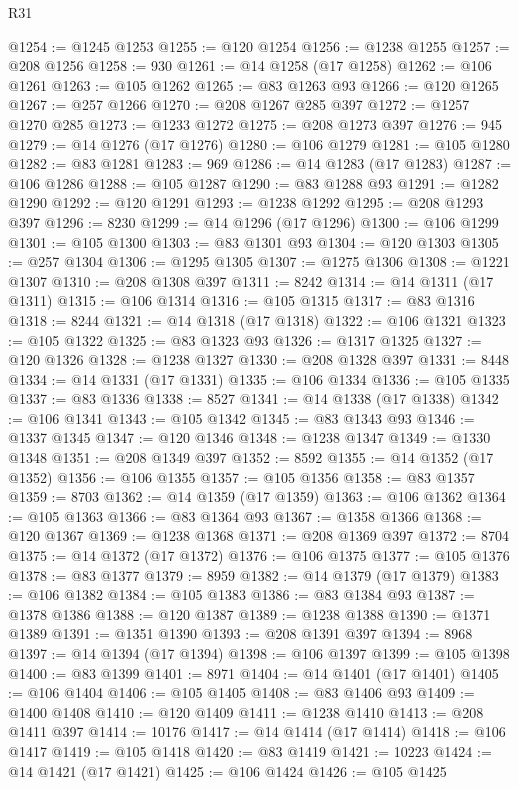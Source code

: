 \begin{lexlean}{R31}
\begin{coremodule}
@1254 := @1245 @1253
@1255 := @120 @1254
@1256 := @1238 @1255
@1257 := @208 @1256
@1258 := 930
@1261 := @14 @1258 (@17 @1258)
@1262 := @106 @1261
@1263 := @105 @1262
@1265 := @83 @1263 @93
@1266 := @120 @1265
@1267 := @257 @1266
@1270 := @208 @1267 @285 @397
@1272 := @1257 @1270 @285
@1273 := @1233 @1272
@1275 := @208 @1273 @397
@1276 := 945
@1279 := @14 @1276 (@17 @1276)
@1280 := @106 @1279
@1281 := @105 @1280
@1282 := @83 @1281
@1283 := 969
@1286 := @14 @1283 (@17 @1283)
@1287 := @106 @1286
@1288 := @105 @1287
@1290 := @83 @1288 @93
@1291 := @1282 @1290
@1292 := @120 @1291
@1293 := @1238 @1292
@1295 := @208 @1293 @397
@1296 := 8230
@1299 := @14 @1296 (@17 @1296)
@1300 := @106 @1299
@1301 := @105 @1300
@1303 := @83 @1301 @93
@1304 := @120 @1303
@1305 := @257 @1304
@1306 := @1295 @1305
@1307 := @1275 @1306
@1308 := @1221 @1307
@1310 := @208 @1308 @397
@1311 := 8242
@1314 := @14 @1311 (@17 @1311)
@1315 := @106 @1314
@1316 := @105 @1315
@1317 := @83 @1316
@1318 := 8244
@1321 := @14 @1318 (@17 @1318)
@1322 := @106 @1321
@1323 := @105 @1322
@1325 := @83 @1323 @93
@1326 := @1317 @1325
@1327 := @120 @1326
@1328 := @1238 @1327
@1330 := @208 @1328 @397
@1331 := 8448
@1334 := @14 @1331 (@17 @1331)
@1335 := @106 @1334
@1336 := @105 @1335
@1337 := @83 @1336
@1338 := 8527
@1341 := @14 @1338 (@17 @1338)
@1342 := @106 @1341
@1343 := @105 @1342
@1345 := @83 @1343 @93
@1346 := @1337 @1345
@1347 := @120 @1346
@1348 := @1238 @1347
@1349 := @1330 @1348
@1351 := @208 @1349 @397
@1352 := 8592
@1355 := @14 @1352 (@17 @1352)
@1356 := @106 @1355
@1357 := @105 @1356
@1358 := @83 @1357
@1359 := 8703
@1362 := @14 @1359 (@17 @1359)
@1363 := @106 @1362
@1364 := @105 @1363
@1366 := @83 @1364 @93
@1367 := @1358 @1366
@1368 := @120 @1367
@1369 := @1238 @1368
@1371 := @208 @1369 @397
@1372 := 8704
@1375 := @14 @1372 (@17 @1372)
@1376 := @106 @1375
@1377 := @105 @1376
@1378 := @83 @1377
@1379 := 8959
@1382 := @14 @1379 (@17 @1379)
@1383 := @106 @1382
@1384 := @105 @1383
@1386 := @83 @1384 @93
@1387 := @1378 @1386
@1388 := @120 @1387
@1389 := @1238 @1388
@1390 := @1371 @1389
@1391 := @1351 @1390
@1393 := @208 @1391 @397
@1394 := 8968
@1397 := @14 @1394 (@17 @1394)
@1398 := @106 @1397
@1399 := @105 @1398
@1400 := @83 @1399
@1401 := 8971
@1404 := @14 @1401 (@17 @1401)
@1405 := @106 @1404
@1406 := @105 @1405
@1408 := @83 @1406 @93
@1409 := @1400 @1408
@1410 := @120 @1409
@1411 := @1238 @1410
@1413 := @208 @1411 @397
@1414 := 10176
@1417 := @14 @1414 (@17 @1414)
@1418 := @106 @1417
@1419 := @105 @1418
@1420 := @83 @1419
@1421 := 10223
@1424 := @14 @1421 (@17 @1421)
@1425 := @106 @1424
@1426 := @105 @1425

\end{coremodule}
\end{lexlean}
